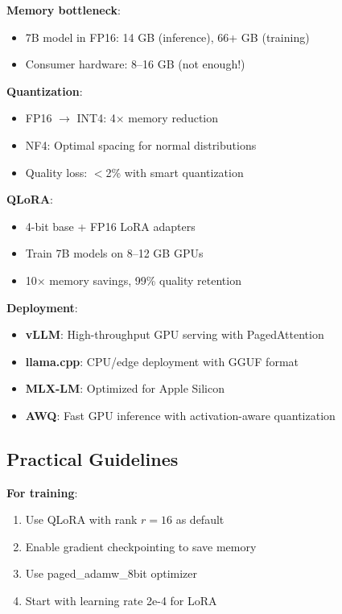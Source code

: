\documentclass{article}
\begin{document}
\begin{tcolorbox}[colback=purple!5!white, colframe=purple!50!black, title=What We Learned]
\textbf{Memory bottleneck}:
\begin{itemize}
\item 7B model in FP16: 14 GB (inference), 66+ GB (training)
\item Consumer hardware: 8--16 GB (not enough!)
\end{itemize}

\textbf{Quantization}:
\begin{itemize}
\item FP16 $\rightarrow$ INT4: 4$\times$ memory reduction
\item NF4: Optimal spacing for normal distributions
\item Quality loss: $<$2\% with smart quantization
\end{itemize}

\textbf{QLoRA}:
\begin{itemize}
\item 4-bit base + FP16 LoRA adapters
\item Train 7B models on 8--12 GB GPUs
\item 10$\times$ memory savings, 99\% quality retention
\end{itemize}

\textbf{Deployment}:
\begin{itemize}
\item \textbf{vLLM}: High-throughput GPU serving with PagedAttention
\item \textbf{llama.cpp}: CPU/edge deployment with GGUF format
\item \textbf{MLX-LM}: Optimized for Apple Silicon
\item \textbf{AWQ}: Fast GPU inference with activation-aware quantization
\end{itemize}
\end{tcolorbox}

\subsection{Practical Guidelines}

\textbf{For training}:
\begin{enumerate}
\item Use QLoRA with rank $r=16$ as default
\item Enable gradient checkpointing to save memory
\item Use paged\_adamw\_8bit optimizer
\item Start with learning rate 2e-4 for LoRA
\end{enumerate}
\end{document}
